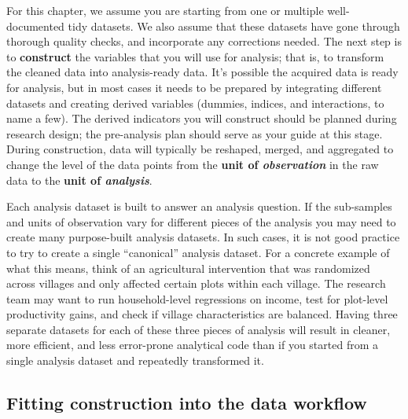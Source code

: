 For this chapter, we assume you are starting from 
one or multiple well-documented tidy\cite{hadley2017R} datasets.
We also assume that these datasets
have gone through thorough quality checks,
and incorporate any corrections needed.
The next step is to \textbf{construct}
the variables that you will use for analysis;
that is, to transform the cleaned data into analysis-ready data.
It's possible the acquired data is ready for analysis,
but in most cases it needs to be prepared by integrating different datasets
and creating derived variables
(dummies, indices, and interactions, to name a few).
The derived indicators you will construct should be
planned during research design;
the pre-analysis plan should serve as your guide
at this stage.
During construction, data will typically be
reshaped, merged, and aggregated to change the level of the data points
from the \textbf{unit of \textit{observation}} in the raw data
to the \textbf{unit of \textit{analysis}}.

Each analysis dataset is built to answer an analysis question.
If the sub-samples and units of observation 
vary for different pieces of the analysis
you may need to create many purpose-built analysis datasets.
In such cases, it is not good practice
to try to create a single ``canonical'' analysis dataset.
For a concrete example of what this means,
think of an agricultural intervention 
that was randomized across villages
and only affected certain plots within each village.
The research team may want to 
run household-level regressions on income,
test for plot-level productivity gains,
and check if village characteristics are balanced.
Having three separate datasets for each of these three pieces of analysis
will result in cleaner, more efficient, and less error-prone analytical code than if
you started from a single analysis dataset and repeatedly transformed it.

\subsection{Fitting construction into the data workflow}

